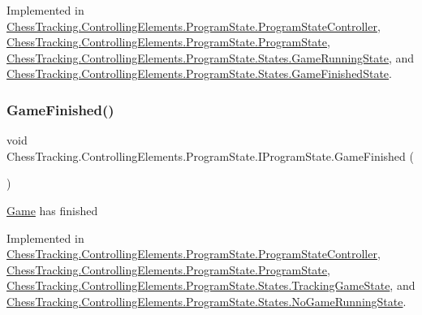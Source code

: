 Implemented in \mbox{\hyperlink{class_chess_tracking_1_1_controlling_elements_1_1_program_state_1_1_program_state_controller_a78fc127e221dc85207312df1a5753268}{Chess\+Tracking.\+Controlling\+Elements.\+Program\+State.\+Program\+State\+Controller}}, \mbox{\hyperlink{class_chess_tracking_1_1_controlling_elements_1_1_program_state_1_1_program_state_a7ff7676272d3449e524a11eb73201e30}{Chess\+Tracking.\+Controlling\+Elements.\+Program\+State.\+Program\+State}}, \mbox{\hyperlink{class_chess_tracking_1_1_controlling_elements_1_1_program_state_1_1_states_1_1_game_running_state_a716f8029e51162d10d89e1a81c97bb32}{Chess\+Tracking.\+Controlling\+Elements.\+Program\+State.\+States.\+Game\+Running\+State}}, and \mbox{\hyperlink{class_chess_tracking_1_1_controlling_elements_1_1_program_state_1_1_states_1_1_game_finished_state_a13eabd72515fdbb1fc9b0026ff7800a7}{Chess\+Tracking.\+Controlling\+Elements.\+Program\+State.\+States.\+Game\+Finished\+State}}.

\mbox{\label{interface_chess_tracking_1_1_controlling_elements_1_1_program_state_1_1_i_program_state_a5c438d1bd53a0dd168eb56e20c482c1f}} 
\subsubsection{\texorpdfstring{GameFinished()}{GameFinished()}}
{\footnotesize\ttfamily void Chess\+Tracking.\+Controlling\+Elements.\+Program\+State.\+I\+Program\+State.\+Game\+Finished (\begin{DoxyParamCaption}{ }\end{DoxyParamCaption})}



\mbox{\hyperlink{namespace_chess_tracking_1_1_game}{Game}} has finished 



Implemented in \mbox{\hyperlink{class_chess_tracking_1_1_controlling_elements_1_1_program_state_1_1_program_state_controller_a20a84c94188c6e15e464152862d13647}{Chess\+Tracking.\+Controlling\+Elements.\+Program\+State.\+Program\+State\+Controller}}, \mbox{\hyperlink{class_chess_tracking_1_1_controlling_elements_1_1_program_state_1_1_program_state_a03a8db068264aa4ec11e8d473b6d3c46}{Chess\+Tracking.\+Controlling\+Elements.\+Program\+State.\+Program\+State}}, \mbox{\hyperlink{class_chess_tracking_1_1_controlling_elements_1_1_program_state_1_1_states_1_1_tracking_game_state_a66e4b6c89dab25aea56c4ca51b5f7b34}{Chess\+Tracking.\+Controlling\+Elements.\+Program\+State.\+States.\+Tracking\+Game\+State}}, and \mbox{\hyperlink{class_chess_tracking_1_1_controlling_elements_1_1_program_state_1_1_states_1_1_no_game_running_state_a9c8a27c252c9b474ab5357dbbf952bb1}{Chess\+Tracking.\+Controlling\+Elements.\+Program\+State.\+States.\+No\+Game\+Running\+State}}.

